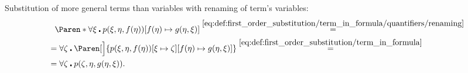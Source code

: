 \begin{example}
\begin{ExEnum}
     Substitution of more general terms than variables with renaming of term's variables:
    \begin{align*}
      &{}\phantom{=}{}
      \Paren*{\forall \xi \centerdot p(\xi, \eta, f(\eta))}[f(\eta) \mapsto g(\eta, \xi)]
      \overset {\eqref{eq:def:first_order_substitution/term_in_formula/quantifiers/renaming}} = \\ &=
      \forall \zeta \centerdot \Paren[\Big]{p(\xi, \eta, f(\eta))[\xi \mapsto \zeta][f(\eta) \mapsto g(\eta, \xi)]}
      \overset {\eqref{eq:def:first_order_substitution/term_in_formula}} = \\ &=
      \forall \zeta \centerdot p(\zeta, \eta, g(\eta, \xi)).
    \end{align*}
  \end{ExEnum}
\end{example}

